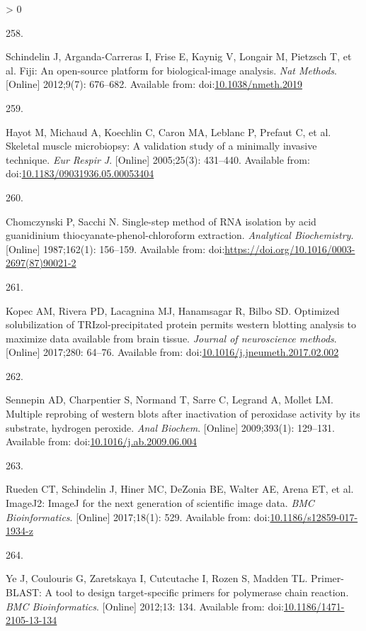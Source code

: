 \documentclass[twoside,10pt]{gihclass} %
\newlength{\cslhangindent}
\newlength{\csllabelwidth}
\newenvironment{CSLReferences}[3] %
 {%
  \setlength{\parindent}{0pt}
  \ifodd #1 \everypar{\setlength{\hangindent}{\cslhangindent}}\ignorespaces\fi
  \ifnum #2 > 0
  \setlength{\parskip}{#2\baselineskip}
  \fi
 }%
 {}
\newcommand{\CSLLeftMargin}[1]{\parbox[t]{\maxof{\widthof{#1}}{\csllabelwidth}}{#1}}
\newcommand{\CSLRightInline}[1]{\parbox[t]{\linewidth}{#1}}
\begin{document}
\begin{CSLReferences}{0}{0}
\leavevmode\hypertarget{ref-RN2561}{}%
\CSLLeftMargin{258. }
\CSLRightInline{Schindelin J, Arganda-Carreras I, Frise E, Kaynig V, Longair M, Pietzsch T, et al. Fiji: An open-source platform for biological-image analysis. \emph{Nat Methods}. {[}Online{]} 2012;9(7): 676--682. Available from: doi:\href{https://doi.org/10.1038/nmeth.2019}{10.1038/nmeth.2019}}

\leavevmode\hypertarget{ref-RN824}{}%
\CSLLeftMargin{259. }
\CSLRightInline{Hayot M, Michaud A, Koechlin C, Caron MA, Leblanc P, Prefaut C, et al. Skeletal muscle microbiopsy: A validation study of a minimally invasive technique. \emph{Eur Respir J}. {[}Online{]} 2005;25(3): 431--440. Available from: doi:\href{https://doi.org/10.1183/09031936.05.00053404}{10.1183/09031936.05.00053404}}

\leavevmode\hypertarget{ref-RN2672}{}%
\CSLLeftMargin{260. }
\CSLRightInline{Chomczynski P, Sacchi N. Single-step method of RNA isolation by acid guanidinium thiocyanate-phenol-chloroform extraction. \emph{Analytical Biochemistry}. {[}Online{]} 1987;162(1): 156--159. Available from: doi:\url{https://doi.org/10.1016/0003-2697(87)90021-2}}

\leavevmode\hypertarget{ref-RN2050}{}%
\CSLLeftMargin{261. }
\CSLRightInline{Kopec AM, Rivera PD, Lacagnina MJ, Hanamsagar R, Bilbo SD. Optimized solubilization of TRIzol-precipitated protein permits western blotting analysis to maximize data available from brain tissue. \emph{Journal of neuroscience methods}. {[}Online{]} 2017;280: 64--76. Available from: doi:\href{https://doi.org/10.1016/j.jneumeth.2017.02.002}{10.1016/j.jneumeth.2017.02.002}}

\leavevmode\hypertarget{ref-RN1930}{}%
\CSLLeftMargin{262. }
\CSLRightInline{Sennepin AD, Charpentier S, Normand T, Sarre C, Legrand A, Mollet LM. Multiple reprobing of western blots after inactivation of peroxidase activity by its substrate, hydrogen peroxide. \emph{Anal Biochem}. {[}Online{]} 2009;393(1): 129--131. Available from: doi:\href{https://doi.org/10.1016/j.ab.2009.06.004}{10.1016/j.ab.2009.06.004}}

\leavevmode\hypertarget{ref-RN2259}{}%
\CSLLeftMargin{263. }
\CSLRightInline{Rueden CT, Schindelin J, Hiner MC, DeZonia BE, Walter AE, Arena ET, et al. ImageJ2: ImageJ for the next generation of scientific image data. \emph{BMC Bioinformatics}. {[}Online{]} 2017;18(1): 529. Available from: doi:\href{https://doi.org/10.1186/s12859-017-1934-z}{10.1186/s12859-017-1934-z}}

\leavevmode\hypertarget{ref-RN1815}{}%
\CSLLeftMargin{264. }
\CSLRightInline{Ye J, Coulouris G, Zaretskaya I, Cutcutache I, Rozen S, Madden TL. Primer-BLAST: A tool to design target-specific primers for polymerase chain reaction. \emph{BMC Bioinformatics}. {[}Online{]} 2012;13: 134. Available from: doi:\href{https://doi.org/10.1186/1471-2105-13-134}{10.1186/1471-2105-13-134}}


\end{CSLReferences}
\end{document}
